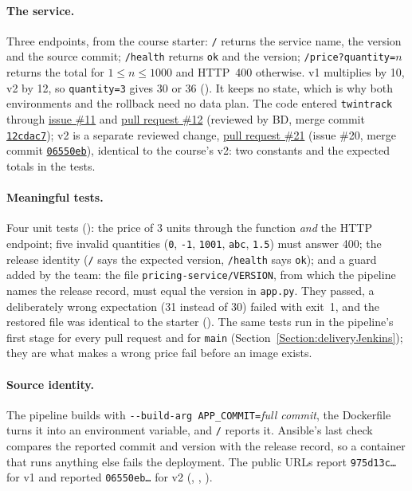 \paragraph{The service.} Three endpoints, from the course starter: \texttt{/} returns the service name, the version and the source commit; \texttt{/health} returns \texttt{ok} and the version; \texttt{/price?quantity=}$n$ returns
the total for $1 \le n \le 1000$ and HTTP~400 otherwise. v1 multiplies by 10, v2 by 12, so \texttt{quantity=3} gives 30 or 36 (). It keeps no state, which is why both environments and the rollback need no data plan.
The code entered \texttt{twintrack} through \href{\GiteaRepoURL/issues/11}{issue \#11} and \href{\GiteaRepoURL/pulls/12}{pull request \#12} (reviewed by BD, merge commit \href{\GiteaRepoURL/commit/12cdac7}{\texttt{12cdac7}}); v2 is a separate reviewed change,
\href{\GiteaRepoURL/pulls/21}{pull request \#21} (issue \#20, merge commit \href{\GiteaRepoURL/commit/06550eb4fe5d3315b31e1a1bd2fe1b4f034af77f}{\texttt{06550eb}}), identical to the course's v2: two constants and the expected totals in the tests.

\paragraph{Meaningful tests.} Four unit tests (): the price of 3 units through the function \emph{and} the HTTP endpoint; five invalid quantities (\texttt{0}, \texttt{-1}, \texttt{1001}, \texttt{abc}, \texttt{1.5}) must answer 400;
the release identity (\texttt{/} says the expected version, \texttt{/health} says \texttt{ok}); and a guard added by the team: the file \texttt{pricing-service/VERSION}, from which the pipeline names the release record, must equal the version
in \texttt{app.py}. They passed, a deliberately wrong expectation (31 instead of 30) failed with exit~1, and the restored file was identical to the starter (). The same tests run in the pipeline's first stage for every pull request and for \texttt{main}
(Section~\ref{Section:deliveryJenkins}); they are what makes a wrong price fail before an image exists.

\paragraph{Source identity.} The pipeline builds with \texttt{-{}-build-arg APP\_COMMIT=}\emph{full commit}, the Dockerfile turns it into an environment variable, and \texttt{/} reports it. Ansible's last check compares the reported commit and version with the release record,
so a container that runs anything else fails the deployment. The public URLs report \texttt{975d13c\ldots} for v1 and reported \texttt{06550eb\ldots} for v2 (, , ).

